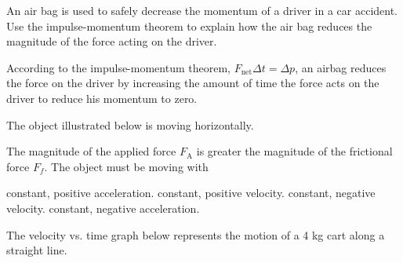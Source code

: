 \documentclass[answers]{exam}
\begin{document}
\begin{questions}
\question
An air bag is used to safely decrease the momentum of a driver in a car accident. Use the impulse-momentum theorem to explain how the air bag reduces the magnitude of the force acting on the driver.

\ifprintanswers
\else
\fillwithlines{2cm}
\fi

\begin{solution}
    According to the impulse-momentum theorem, $F_\mathrm{net} \Delta t = \Delta p$, an airbag reduces the force on the driver by increasing the amount of time the force acts on the driver to reduce his momentum to zero.
\end{solution}


\question
The object illustrated below is moving horizontally. 

\begin{center}
\end{center}

The magnitude of the applied force $F_\mathrm{A}$ is greater the magnitude of the frictional force $F_f$. The object must be moving with 

\begin{randomizechoices}
    \correctchoice constant, positive acceleration.
    \choice constant, positive velocity.
    \choice constant, negative velocity.
    \choice constant, negative acceleration.
\end{randomizechoices}

\question
The velocity vs. time graph below represents the motion of a 4 kg cart along a straight line.

\begin{center}
\end{center}


\end{questions}
\end{document}
